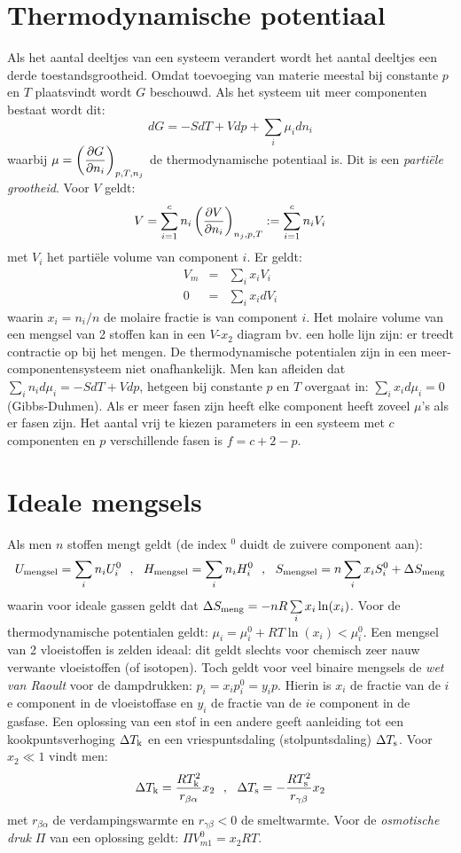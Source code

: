 \documentclass[twoside]{report}
\begin{document}
\section{Thermodynamische potentiaal}
Als het aantal deeltjes van een systeem verandert wordt het aantal deeltjes
een derde toestandsgrootheid. Omdat toevoeging van materie meestal bij
constante $p$ en $T$ plaatsvindt wordt $G$ beschouwd. Als het systeem uit
meer componenten bestaat wordt dit:
\[
dG=-SdT+Vdp+\sum_i\mu_idn_i
\]
waarbij $\displaystyle \mu=\left(\frac{\partial G}{\partial n_i}\right)_{p,T,n_j}$ de thermodynamische
potentiaal is. Dit is een {\it parti\"ele grootheid}. Voor $V$ geldt:
\[
V=\sum_{i=1}^c n_i\left(\frac{\partial V}{\partial n_i}\right)_{n_j,p,T}:=\sum_{i=1}^c n_i V_i
\]
met $V_i$ het parti\"ele volume van component $i$. Er geldt:
\begin{eqnarray*}
V_m&=&\sum_i x_i V_i\\
0&=&\sum_i x_i dV_i
\end{eqnarray*}
waarin $x_i=n_i/n$ de molaire fractie is van component $i$. Het molaire volume
van een mengsel van 2 stoffen kan in een $V$-$x_2$ diagram bv. een holle
lijn zijn: er treedt contractie op bij het mengen.
\npar
De thermodynamische potentialen zijn in een meer-componentensysteem niet
onafhankelijk. Men kan afleiden dat
$\sum\limits_i n_i d\mu_i=-SdT+Vdp$, hetgeen bij constante $p$ en $T$ overgaat
in: $\sum\limits_i x_i d\mu_i=0$ (Gibbs-Duhmen).
\npar
Als er meer fasen zijn heeft elke component heeft zoveel $\mu$'s als er fasen
zijn. Het aantal vrij te kiezen parameters in een systeem met $c$ componenten
en $p$ verschillende fasen is $f=c+2-p$.

\section{Ideale mengsels}
Als men $n$ stoffen mengt geldt (de index $^0$ duidt de zuivere component aan):
\[
U_{\rm mengsel}=\sum_i n_i U^0_i~~,~~H_{\rm mengsel}=\sum_i n_i H^0_i~~,~~
S_{\rm mengsel}=n\sum_i x_i S^0_i+\Delta S_{\rm meng}
\]
waarin voor ideale gassen geldt dat
$\Delta S_{\rm meng}=-nR\sum\limits_i x_i\ln(x_i)$.
\npar
Voor de thermodynamische potentialen geldt: $\mu_i=\mu_i^0+RT\ln(x_i)<\mu_i^0$.
Een mengsel van 2 vloeistoffen is zelden ideaal: dit geldt slechts voor chemisch
zeer nauw verwante vloeistoffen (of isotopen). Toch geldt voor veel binaire
mengsels de {\it wet van Raoult} voor de dampdrukken: $p_i=x_ip^0_i=y_ip$.
Hierin is $x_i$ de fractie van de $i$e component in de vloeistoffase en $y_i$
de fractie van de $i$e component in de gasfase.
\npar
Een oplossing van een stof in een andere geeft aanleiding tot een
kookpuntsverhoging $\Delta T_{\rm k}$ en een vriespuntsdaling
(stolpuntsdaling) $\Delta T_{\rm s}$. Voor $x_2\ll1$
vindt men:
\[
\Delta T_{\rm k}=\frac{RT_{\rm k}^2}{r_{\beta\alpha}}x_2~~,~~
\Delta T_{\rm s}=-\frac{RT_{\rm s}^2}{r_{\gamma\beta}}x_2
\]
met $r_{\beta\alpha}$ de verdampingswarmte en $r_{\gamma\beta}<0$ de
smeltwarmte. Voor de {\it osmotische druk} $\Pi$ van een oplossing geldt:
$\Pi V_{m1}^0=x_2RT$.
\end{document}
